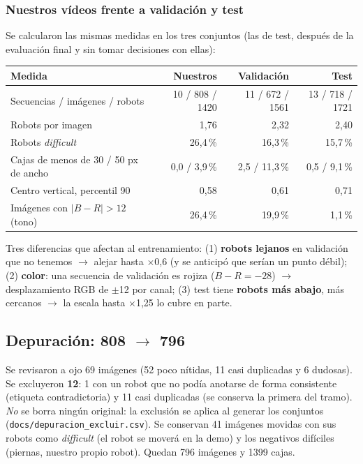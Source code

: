 \documentclass[11pt,a4paper]{article}
\newcommand{\cod}[1]{\texttt{#1}}
\begin{document}
\subsubsection*{Nuestros vídeos frente a validación y test}
Se calcularon las mismas medidas en los tres conjuntos (las de test, después de la evaluación final y sin tomar decisiones con ellas):

\begin{center}
\small
\begin{tabular}{@{}lrrr@{}}
\toprule
\textbf{Medida} & \textbf{Nuestros} & \textbf{Validación} & \textbf{Test} \\
\midrule
Secuencias / imágenes / robots & 10 / 808 / 1420 & 11 / 672 / 1561 & 13 / 718 / 1721 \\
Robots por imagen & 1,76 & 2,32 & 2,40 \\
Robots \emph{difficult} & 26,4\,\% & 16,3\,\% & 15,7\,\% \\
Cajas de menos de 30 / 50 px de ancho & 0,0 / 3,9\,\% & 2,5 / 11,3\,\% & 0,5 / 9,1\,\% \\
Centro vertical, percentil 90 & 0,58 & 0,61 & 0,71 \\
Imágenes con $|B-R| > 12$ (tono) & 26,4\,\% & 19,9\,\% & 1,1\,\% \\
\bottomrule
\end{tabular}
\end{center}

Tres diferencias que afectan al entrenamiento: (1) \textbf{robots lejanos} en validación que no tenemos $\rightarrow$ alejar hasta $\times$0,6 (y se anticipó que serían un punto débil); (2) \textbf{color}: una secuencia de validación es rojiza ($B-R = -28$) $\rightarrow$ desplazamiento RGB de $\pm$12 por canal; (3) test tiene \textbf{robots más abajo}, más cercanos $\rightarrow$ la escala hasta $\times$1,25 lo cubre en parte.

\subsection{\texorpdfstring{Depuración: 808 $\rightarrow$ 796}{Depuración: 808 a 796}}
Se revisaron a ojo 69 imágenes (52 poco nítidas, 11 casi duplicadas y 6 dudosas). Se excluyeron \textbf{12}: 1 con un robot que no podía anotarse de forma consistente (etiqueta contradictoria) y 11 casi duplicadas (se conserva la primera del tramo). \emph{No} se borra ningún original: la exclusión se aplica al generar los conjuntos (\cod{docs/\allowbreak{}depuracion\_\allowbreak{}excluir.csv}). Se conservan 41 imágenes movidas con sus robots como \emph{difficult} (el robot se moverá en la demo) y los negativos difíciles (piernas, nuestro propio robot). Quedan 796 imágenes y 1399 cajas.
\end{document}
